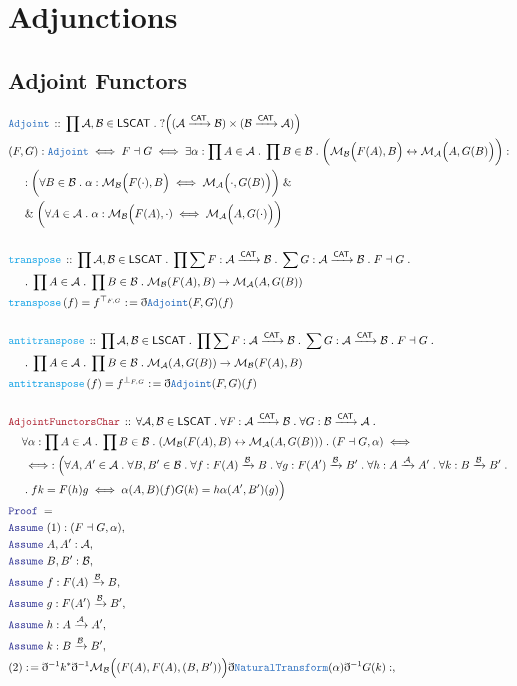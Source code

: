 \documentclass[12pt]{scrartcl}
\newcommand{\TYPE}[1]{\textcolor{NavyBlue}{\mathtt{#1}}}
\newcommand{\FUNC}[1]{\textcolor{Cerulean}{\mathtt{#1}}}
\newcommand{\LOGIC}[1]{\textcolor{Blue}{\mathtt{#1}}}
\newcommand{\THM}[1]{\textcolor{Maroon}{\mathtt{#1}}}
\renewcommand{\.}{\; . \;}
\newcommand{\de}{: \kern 0.1pc =}
\newcommand{\Act}[1]{\left( #1 \right)}
\newcommand{\Theorem}[2]{& \THM{#1} \, :: \, #2 \\ & \Proof = \\ }
\newcommand{\DeclareType}[2]{& \TYPE{#1} \, :: \, #2 \\}
\newcommand{\DefineNamedType}[4]{& #1 : \TYPE{#2} \iff #3 \iff #4 \\}
\newcommand{\DeclareFunc}[2]{& \FUNC{#1} \, :: \, #2 \\}
\newcommand{\DefineNamedFunc}[4]{&  \FUNC{#1}\Act{#2} = #3 \de #4 \\}
\newcommand{\NewLine}{\\ & \kern 1pc}
\newcommand{\Page}[1]{ \begin{align*} #1 \end{align*}   }
\newcommand{ \bd }{ \ByDef }
\renewcommand{\And}{\; \& \;}
\newcommand{\Mor}{\mathcal{M}}
\newcommand{\ToBij}{\leftrightarrow}
\newcommand{\Arrow}{\xrightarrow}
\newcommand{\Say}[3]{& #1 \de #2 : #3, \\}
\newcommand{\Assume}[2]{& \LOGIC{Assume} \; #1 : #2, \\}
\newcommand{\ByDef}{\eth}
\newcommand{\Proof}{\LOGIC{Proof} \; }
\newcommand{\NT}{\TYPE{NaturalTransform}}
\newcommand{\A}{\mathcal{A}}
\newcommand{\B}{\mathcal{B}}
\newcommand{\CAT}{\mathsf{CAT}}
\begin{document}
\section{Adjunctions}
\subsection{Adjoint Functors}
\Page{
	\DeclareType{Adjoint}{\prod \A, \B \in \mathsf{LSCAT} \. ?\Big((\A \Arrow{\CAT} \B) \times (\B \Arrow{\CAT} \A)\Big)}
	\DefineNamedType{(F,G)}{Adjoint}{F \dashv G}
	{
		\exists  \alpha : \prod A \in \A \.  
			\prod B \in \B \.
			\bigg( \Mor_\B\Big( F(A),B \Big)  \ToBij \Mor_\A\Big(A,G(B)\Big) \bigg) : 
			\NewLine :
		\bigg( \forall B \in \B \.
			\alpha : \Mor_\B\Big(F(\cdot),B\Big) \iff \Mor_\A \Big( \cdot,G(B)\Big) \bigg) \And \NewLine \And
		\bigg( \forall A \in \A \. 
			\alpha : \Mor_\B\Big( F(A),\cdot) \iff \Mor_\A \Big( A, G(\cdot)\Big) \bigg)
	}
	\\
	\DeclareFunc{transpose}{
		\prod \A,\B \in \mathsf{LSCAT} \.
		\prod \sum  F : \A \Arrow{\CAT} \B \.
		 \sum  G : \A \Arrow{\CAT} \B \.
		  F \dashv G   \. \NewLine \.
		\prod A \in \A \.
		\prod B \in \B \.
		\Mor_{\B}(F(A),B) \to \Mor_{\A}(A,G(B))
	}
	\DefineNamedFunc{transpose}{f}{f^{\top_{F,G}}}{\bd \TYPE{Adjoint}(F,G)(f)}
	\\
	\DeclareFunc{antitranspose}{
		\prod \A,\B \in \mathsf{LSCAT} \.
		\prod \sum  F : \A \Arrow{\CAT} \B \.
		 \sum  G : \A \Arrow{\CAT} \B \.
		  F \dashv G   \. \NewLine \.
		\prod A \in \A \.
		\prod B \in \B \.
		\Mor_{\A}(A,G(B)) \to \Mor_{\B}(F(A),B)
	}
	\DefineNamedFunc{antitranspose}{f}{f^{\bot_{F,G}}}{\bd \TYPE{Adjoint}(F,G)(f)}
	\\
	\Theorem{AdjointFunctorsChar}{
		\forall \A,\B \in \mathsf{LSCAT} \.
		\forall F  : \A \Arrow{\CAT} \B \.
		\forall G : \B \Arrow{\CAT} \A  \.
		\NewLine \forall \alpha : 
			\prod A \in \A \. 
			\prod B \in \B \. 
			(\Mor_\B(F(A),B) \ToBij \Mor_\A(A,G(B))) \.
		(F \dashv G,\alpha) \iff \NewLine \iff:
		\Big(	\forall A,A' \in \A \.
			\forall B,B' \in \B \.
			\forall f : F(A) \Arrow{\B} B \.
			\forall g : F(A') \Arrow{\B} B' \.
			\forall h : A \Arrow{\A} A'  \.
			\forall k : B \Arrow{\B} B' \.  \NewLine \. 
				fk = F(h) g \iff \alpha(A,B)(f)G(k) = h \alpha(A',B')(g) 
		\Big)
	}
	\Assume{(1)}{ (F \dashv G, \alpha )  }
	\Assume{A,A'}{\A}
	\Assume{B,B'}{\B}
	\Assume{f}{F(A) \Arrow{\B} B}
	\Assume{g}{F(A') \Arrow{\B} B'}
	\Assume{h}{A \Arrow{\A} A'}
	\Assume{k}{B \Arrow{\B} B'}
	\Say{(2)}{  \bd^{-1} k^*  \bd^{-1} \Mor_\B\Big((F(A),F(A),(B,B'))\Big)  \bd \NT(\alpha) \bd^{-1} G(k)}{
}}
\end{document}
